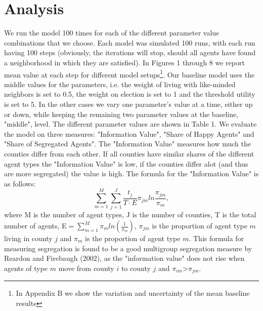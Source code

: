\documentclass[12pt, a4paper]{article}
\begin{document}
	
	
	
	
	
	
	\section{\label{sec_res}Analysis}
	We run the model 100 times for each of the different parameter value combinations that we choose. Each model was simulated 100 runs, with each run having 100 steps (obviously, the iterations will stop, should all agents have found a neighborhood in which they are satisfied). In Figures 1 through 8 we report mean value at each step for different model setups\footnote{In Appendix B we show the variation and uncertainty of the mean baseline results}. Our baseline model uses the middle values for the parameters, i.e. the weight of living with like-minded neighbors is set to 0.5, the weight on election is set to 1 and the threshold utility is set to 5. In the other cases we vary one parameter's value at a time, either up or down, while keeping the remaining two parameter values at the baseline, "middle", level. The different parameter values are shown in Table 1. We evaluate the model on three measures: "Information Value", "Share of Happy Agents" and "Share of Segregated Agents". The "Information Value" measures how much the counties differ from each other. If all counties have similar shares of the different agent types the "Information Value" is low, if the counties differ alot (and thus are more segregated) the value is high. The formula for the "Information Value" is as follows: \newline
	$$\sum_{m=1}^{M}\sum_{j=1}^{J}\frac{t_j}{T \cdot E}\pi_{jm}ln\frac{\pi_{jm}}{\pi_m},$$ where M is the number of agent types, J is the number of counties, T is the total number of agents, E$=\sum_{m=1}^{M}\pi_m ln(\frac{1}{\pi_m})$, $\pi_{jm}$ is the proportion of agent type $m$ living in county $j$ and $\pi_m$ is the proportion of agent type $m$. This formula for measuring segregation is found to be a good multigroup segregation measure by Reardon and Firebaugh (2002), as the "information value" does not rise when agents of type $m$ move from county $i$ to county $j$ and $\pi_{im}$\textgreater$\pi_{jm}$.
	
\end{document}
